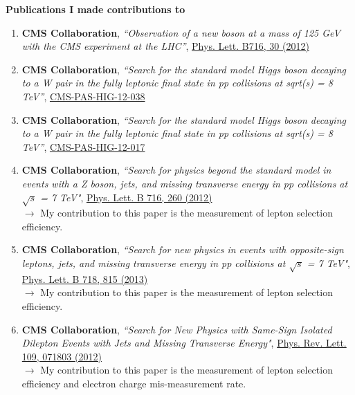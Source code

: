 \documentclass[12pt,letter]{article}
\begin{document}
\textbf{\large Publications I made contributions to}
\\
\begin{enumerate}

\item 
\textbf{CMS Collaboration},
\textit{``Observation of a new boson at a mass of 125 GeV with the CMS experiment at the LHC''},
\href{http://www.sciencedirect.com/science/article/pii/S0370269312008581/pdfft?md5=f47b64db1c880516e0ca9318f1903eec&pid=1-s2.0-S0370269312008581-main.pdf}{Phys. Lett. B716, 30 (2012)}

\item 
\textbf{CMS Collaboration}, \textit{``Search for the standard model Higgs boson decaying to a W pair in the fully leptonic final state in pp collisions at sqrt(s) = 8 TeV''},  
\href{http://cds.cern.ch/record/1478185/files/HIG-12-038-pas.pdf}{CMS-PAS-HIG-12-038} 

\item 
\textbf{CMS Collaboration}, \textit{``Search for the standard model Higgs boson decaying to a W pair in the fully leptonic final state in pp collisions at sqrt(s) = 8 TeV''},   
\href{http://cds.cern.ch/record/1460424/files/HIG-12-017-pas.pdf}{CMS-PAS-HIG-12-017}  

\item \textbf{CMS Collaboration},
\textit{``Search for physics beyond the standard model in events with a Z boson, jets, and missing transverse energy in pp collisions at $\sqrt{s}$ = 7 TeV"},  
\href{http://www.sciencedirect.com/science/article/pii/S0370269312008635/pdfft?md5=9c21770ab78f566c8ec5a3fba274e84f&pid=1-s2.0-S0370269312008635-main.pdf}{Phys. Lett. B 716, 260 (2012)}  \\ 
$\rightarrow$ My contribution to this paper is the measurement of lepton selection efficiency.


\item \textbf{CMS Collaboration},
\textit{``Search for new physics in events with opposite-sign leptons, jets, and missing transverse energy in pp collisions at $\sqrt{s}$ = 7 TeV"}, 
\href{http://www.sciencedirect.com/science/article/pii/S0370269312012014/pdfft?md5=6f0d95453723bcfabc4eff7d56540b74&pid=1-s2.0-S0370269312012014-main.pdf}{Phys. Lett. B 718, 815 (2013)} \\
$\rightarrow$ My contribution to this paper is the measurement of lepton selection efficiency.

\item 
\textbf{CMS Collaboration},
\textit{``Search for New Physics with Same-Sign Isolated Dilepton Events
with Jets and Missing Transverse Energy"},
\href{http://prl.aps.org/pdf/PRL/v109/i7/e071803}{Phys. Rev. Lett. 109, 071803 (2012)}  \\
$\rightarrow$ My contribution to this paper is the measurement of lepton selection efficiency
and electron charge mis-measurement rate. 


\end{enumerate}
\end{document}
